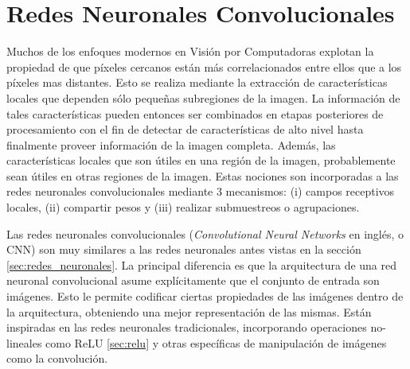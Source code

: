 \documentclass[a4paper,11pt,spanish]{book}
\begin{document}
  \section {Redes Neuronales Convolucionales} \label{sec:redes_convolucionales}
      Muchos de los enfoques modernos en Visión por Computadoras explotan la propiedad de que píxeles cercanos están más correlacionados entre ellos 
      que a los píxeles mas distantes. 
      Esto se realiza mediante la extracción de características locales que dependen sólo pequeñas subregiones de la imagen. 
      La información de tales características pueden entonces ser combinados en etapas posteriores de procesamiento con el fin de detectar de características de alto nivel 
      hasta finalmente proveer información de la imagen completa. 
      Además, las características locales que son útiles en una región de la imagen, probablemente sean útiles en otras regiones de la imagen.
      Estas nociones son incorporadas a las redes neuronales convolucionales mediante 3 mecanismos: (i) campos receptivos locales, (ii) compartir pesos y 
      (iii) realizar submuestreos o agrupaciones.
  
      Las redes neuronales convolucionales (\emph{Convolutional Neural Networks} en inglés, o CNN) son muy similares a las redes neuronales antes vistas en la 
      sección \ref{sec:redes_neuronales}.
      La principal diferencia es que la arquitectura de una red neuronal convolucional asume explícitamente que el conjunto de entrada son imágenes. 
      Esto le permite codificar ciertas propiedades de las imágenes dentro de la arquitectura, obteniendo una mejor representación de las mismas.
      Están inspiradas en las redes neuronales tradicionales, incorporando operaciones no-lineales como ReLU \ref{sec:relu}  y 
      otras específicas de manipulación de imágenes como la convolución.
      
\end{document}
